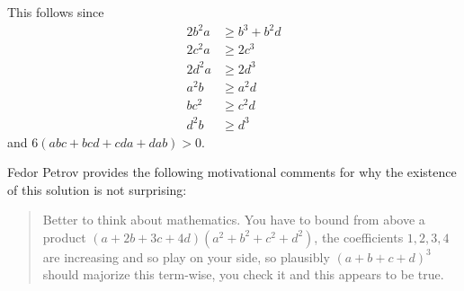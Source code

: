 \documentclass[11pt]{scrartcl}
\begin{document}
This follows since
\begin{align*}
  2b^2a &\ge b^3 + b^2d \\
  2c^2a &\ge 2c^3 \\
  2d^2a &\ge 2d^3  \\
  a^2b &\ge a^2d \\
  bc^2 &\ge c^2d  \\
  d^2b &\ge d^3
\end{align*}
and $6(abc+bcd+cda+dab) > 0$.

\begin{remark*}
  Fedor Petrov provides the following motivational comments
  for why the existence of this solution is not surprising:
  \begin{quote}
    Better to think about mathematics.
    You have to bound from above a product $(a+2b+3c+4d)(a^2+b^2+c^2+d^2)$,
    the coefficients $1,2,3,4$ are increasing and so play on your side,
    so plausibly $(a+b+c+d)^3$ should majorize this term-wise,
    you check it and this appears to be true.
  \end{quote}
\end{remark*}
\pagebreak
\end{document}
